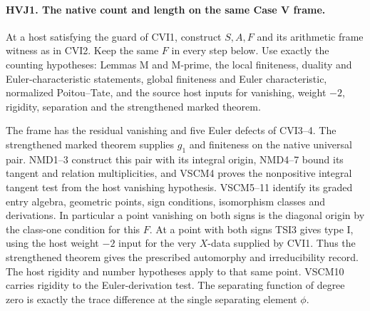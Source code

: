 \paragraph{HVJ1. The native count and length on the same Case V frame.}
At a host satisfying the guard of CVI1, construct $S,A,F$ and its
arithmetic frame witness as in CVI2. Keep the same $F$ in every
step below. Use exactly the counting hypotheses: Lemmas M and M-prime,
the local finiteness, duality and Euler-characteristic statements,
global finiteness and Euler characteristic, normalized Poitou--Tate,
and the source host inputs for vanishing, weight $-2$, rigidity,
separation and the strengthened marked theorem.

The frame has the residual vanishing and five Euler defects of CVI3--4.
The strengthened marked theorem supplies $g_1$ and finiteness on the
native universal pair. NMD1--3 construct this pair with its integral
origin, NMD4--7 bound its tangent and relation multiplicities, and VSCM4
proves the nonpositive integral tangent test from the host vanishing
hypothesis. VSCM5--11 identify its graded entry algebra, geometric
points, sign conditions, isomorphism classes and derivations. In
particular a point vanishing on both signs is the diagonal origin by
the class-one condition for this $F$. At a point with both signs
TSI3 gives type I, using the host weight $-2$ input for the very
$X$-data supplied by CVI1. Thus the strengthened theorem gives the
prescribed automorphy and irreducibility record. The host rigidity and
number hypotheses apply to that same point. VSCM10 carries rigidity
to the Euler-derivation test. The separating function of degree zero
is exactly the trace difference at the single separating element $\phi$.

